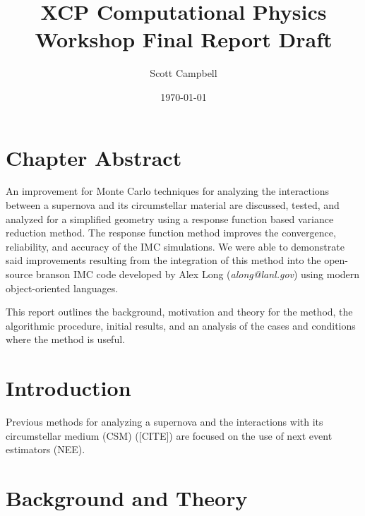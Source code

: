 \documentclass[]{article}
\begin{document}
	\title{XCP Computational Physics Workshop Final Report Draft}
	\author{Scott Campbell}
	\date{\today}
	
	\maketitle
	
\section{Chapter Abstract}
	An improvement for Monte Carlo techniques for analyzing the interactions between a supernova and its circumstellar material are discussed, tested, and analyzed for a simplified geometry using a response function based variance reduction method. The response function method improves the convergence, reliability, and accuracy of the IMC simulations. We were able to demonstrate said improvements resulting from the integration of this method into the open-source branson IMC code developed by Alex Long (\textit{along@lanl.gov}) using modern object-oriented languages. 
	
	This report outlines the background, motivation and theory for the method, the algorithmic procedure, initial results, and an analysis of the cases and conditions where the method is useful. 
	
\section{Introduction}
	Previous methods for analyzing a supernova and the interactions with its circumstellar medium (CSM) ([CITE]) are focused on the use of next event estimators (NEE).
	
\section{Background and Theory}
\end{document}
